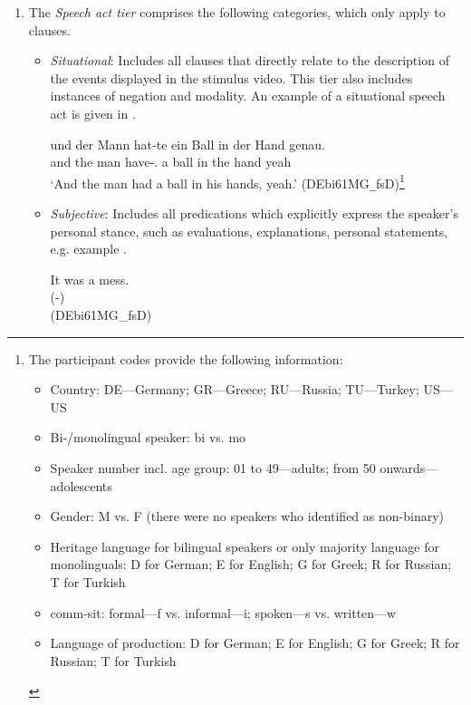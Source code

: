 \documentclass[output=paper,colorlinks,citecolor=brown]{langscibook}
\begin{document}
\begin{enumerate}[label=\Roman*.]
\item
The \textit{Speech act tier} comprises the following categories, which only apply to clauses.

\begin{itemize}
\item
\textit{Situational}: Includes all clauses that directly relate to the description of the events displayed in the stimulus video. This tier also includes instances of negation and modality. An example of a situational speech act is given in .

\ea
\label{ex:schroederetal:ball}
\gll und der Mann  hat-te ein Ball in der Hand genau.\\
and the man have-\Pst.\Tsg{} a ball in the hand yeah\\
\glt `And the man had a ball in his hands, yeah.' (DEbi61MG\verb|_|fsD)\footnote{The participant codes provide the following information:
\begin{itemize}
    \item Country: DE—Germany; GR—Greece; RU—Russia; TU—Turkey; US—US
    \item Bi-/monolingual speaker: bi vs. mo
    \item Speaker number incl. age group: 01 to 49—adults; from 50 onwards—adolescents
    \item Gender: M vs. F (there were no speakers who identified as non-binary)
    \item Heritage language for bilingual speakers or only majority language for monolinguals: D for German; E for English; G for Greek; R for Russian; T for Turkish
    \item comm-sit: formal—f vs. informal—i; spoken—s vs. written—w
    \item Language of production: D for German; E for English; G for Greek; R for Russian; T for Turkish
\end{itemize}
} 
\z


\item
\textit{Subjective}: Includes all predications which explicitly express the speaker’s personal stance, such as evaluations, explanations, personal statements, e.g. example .

\ea
\label{ex:schroederetal:mess}
\gll It was a mess.\\
(-) \\ %
\glt (DEbi61MG\_fsD)
\z


\end{itemize}
\end{enumerate}
\end{document}
